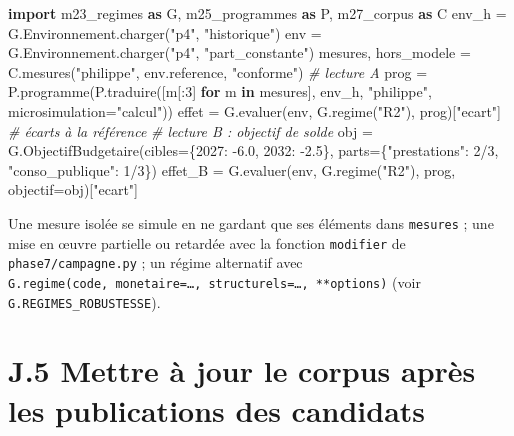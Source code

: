 \documentclass[
  11pt,
  11pt,
  a4paper,
  openany]{book}
\newenvironment{Shaded}{}{}
\newcommand{\CommentTok}[1]{\textcolor[rgb]{0.38,0.63,0.69}{\textit{#1}}}
\newcommand{\ControlFlowTok}[1]{\textcolor[rgb]{0.00,0.44,0.13}{\textbf{#1}}}
\newcommand{\DecValTok}[1]{\textcolor[rgb]{0.25,0.63,0.44}{#1}}
\newcommand{\FloatTok}[1]{\textcolor[rgb]{0.25,0.63,0.44}{#1}}
\newcommand{\ImportTok}[1]{\textcolor[rgb]{0.00,0.50,0.00}{\textbf{#1}}}
\newcommand{\KeywordTok}[1]{\textcolor[rgb]{0.00,0.44,0.13}{\textbf{#1}}}
\newcommand{\NormalTok}[1]{#1}
\newcommand{\OperatorTok}[1]{\textcolor[rgb]{0.40,0.40,0.40}{#1}}
\newcommand{\StringTok}[1]{\textcolor[rgb]{0.25,0.44,0.63}{#1}}
\begin{document}
\begin{Shaded}
\begin{Highlighting}[]
\ImportTok{import}\NormalTok{ m23\_regimes }\ImportTok{as}\NormalTok{ G, m25\_programmes }\ImportTok{as}\NormalTok{ P, m27\_corpus }\ImportTok{as}\NormalTok{ C}
\NormalTok{env\_h }\OperatorTok{=}\NormalTok{ G.Environnement.charger(}\StringTok{"p4"}\NormalTok{, }\StringTok{"historique"}\NormalTok{)}
\NormalTok{env }\OperatorTok{=}\NormalTok{ G.Environnement.charger(}\StringTok{"p4"}\NormalTok{, }\StringTok{"part\_constante"}\NormalTok{)}
\NormalTok{mesures, hors\_modele }\OperatorTok{=}\NormalTok{ C.mesures(}\StringTok{"philippe"}\NormalTok{, env.reference, }\StringTok{"conforme"}\NormalTok{)   }\CommentTok{\# lecture A}
\NormalTok{prog }\OperatorTok{=}\NormalTok{ P.programme(P.traduire([m[:}\DecValTok{3}\NormalTok{] }\ControlFlowTok{for}\NormalTok{ m }\KeywordTok{in}\NormalTok{ mesures], env\_h, }\StringTok{"philippe"}\NormalTok{, microsimulation}\OperatorTok{=}\StringTok{"calcul"}\NormalTok{))}
\NormalTok{effet }\OperatorTok{=}\NormalTok{ G.evaluer(env, G.regime(}\StringTok{"R2"}\NormalTok{), prog)[}\StringTok{"ecart"}\NormalTok{]                     }\CommentTok{\# écarts à la référence}
\CommentTok{\# lecture B : objectif de solde}
\NormalTok{obj }\OperatorTok{=}\NormalTok{ G.ObjectifBudgetaire(cibles}\OperatorTok{=}\NormalTok{\{}\DecValTok{2027}\NormalTok{: }\OperatorTok{{-}}\FloatTok{6.0}\NormalTok{, }\DecValTok{2032}\NormalTok{: }\OperatorTok{{-}}\FloatTok{2.5}\NormalTok{\}, parts}\OperatorTok{=}\NormalTok{\{}\StringTok{"prestations"}\NormalTok{: }\DecValTok{2}\OperatorTok{/}\DecValTok{3}\NormalTok{, }\StringTok{"conso\_publique"}\NormalTok{: }\DecValTok{1}\OperatorTok{/}\DecValTok{3}\NormalTok{\})}
\NormalTok{effet\_B }\OperatorTok{=}\NormalTok{ G.evaluer(env, G.regime(}\StringTok{"R2"}\NormalTok{), prog, objectif}\OperatorTok{=}\NormalTok{obj)[}\StringTok{"ecart"}\NormalTok{]}
\end{Highlighting}
\end{Shaded}

Une mesure isolée se simule en ne gardant que ses éléments dans
\texttt{mesures} ; une mise en œuvre partielle ou retardée avec la
fonction \texttt{modifier} de \texttt{phase7/campagne.py} ; un régime
alternatif avec
\texttt{G.regime(code,\ monetaire=…,\ structurels=…,\ **options)} (voir
\texttt{G.REGIMES\_ROBUSTESSE}).

\hypertarget{j.5-mettre-uxe0-jour-le-corpus-apruxe8s-les-publications-des-candidats}{%
\section{J.5 Mettre à jour le corpus après les publications des
candidats}\label{j.5-mettre-uxe0-jour-le-corpus-apruxe8s-les-publications-des-candidats}}
\end{document}
